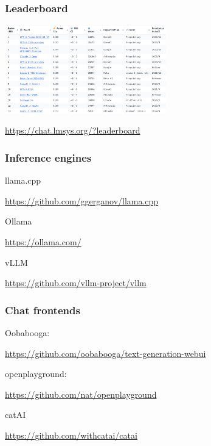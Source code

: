 \documentclass[17pt,aspectratio=169,hyperref={pdfusetitle,colorlinks,allcolors=olive}]{beamer}
\begin{document}
\begin{frame}[fragile]
\frametitle{Leaderboard}

    \includegraphics[width=7cm]{figs/leaderboard}


\url{https://chat.lmsys.org/?leaderboard}

\end{frame}


\begin{frame}[fragile]
\frametitle{Inference engines}

llama.cpp

\begin{flushright}
  \url{https://github.com/ggerganov/llama.cpp}
\end{flushright}

Ollama

\begin{flushright}
  \url{https://ollama.com/}
\end{flushright}

vLLM

\begin{flushright}
  \url{https://github.com/vllm-project/vllm}
\end{flushright}


\end{frame}


\begin{frame}[fragile]
\frametitle{Chat frontends}

Oobabooga:
\begin{flushright}
\url{https://github.com/oobabooga/text-generation-webui}
\end{flushright}

openplayground:
\begin{flushright}
\url{https://github.com/nat/openplayground}
\end{flushright}

catAI
\begin{flushright}
\url{https://github.com/withcatai/catai}
\end{flushright}

\end{frame}
\end{document}
